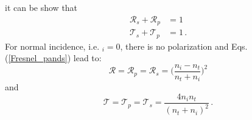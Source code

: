 it can be show that
\begin{equation}
\begin{split}
\mathcal{R}_s+\mathcal{R}_p &= 1\\
\mathcal{T}_s+\mathcal{T}_p &=1\,.
\end{split}
\end{equation}
For normal incidence, i.e. \myangle$_i = 0$, there is no polarization and Eqs. (\ref{Fresnel_pands}) lead to:
\begin{equation}
\mathcal{R} = \mathcal{R}_p = \mathcal{R}_s = \Bigg(\frac{n_i-n_t}{n_t+n_i}\Bigg)^2
\end{equation}
and 
\begin{equation}
\mathcal{T} = \mathcal{T}_p = \mathcal{T}_s = \frac{4n_i n_t}{(n_t+n_i)^2}\,.
\end{equation}


































